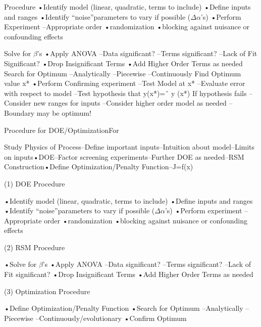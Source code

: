 Procedure
•Identify model (linear, quadratic, terms to include)
•Define inputs and ranges
•Identify “noise”parameters to vary if possible ($\Delta \alpha$’s)
•Perform Experiment
–Appropriate order
•randomization
•blocking against nuisance or confounding effects


Solve for $\beta$’s
•Apply ANOVA
–Data significant?
–Terms significant?
–Lack of Fit Significant?
•Drop Insignificant Terms
•Add Higher Order Terms as needed
Search for Optimum
–Analytically
–Piecewise
–Continuously
Find Optimum value x*
•Perform Confirming experiment
–Test Model at x*
–Evaluate error with respect to model
–Test hypothesis that
y(x*)=ˆ y (x*)
If hypothesis fails
–Consider new ranges for inputs
–Consider higher order model as needed
–Boundary may be optimum!

Procedure for DOE/OptimizationFor

Study Physics of Process–Define important inputs–Intuition about model–Limits on inputs•DOE–Factor screening experiments–Further DOE as needed–RSM Construction•Define Optimization/Penalty Function–J=f(x)


(1) DOE Procedure


•Identify model (linear, quadratic, terms to include)
•Define inputs and ranges
•Identify “noise”parameters to vary if possible ($\Delta \alpha$’s)
•Perform experiment
–Appropriate order
•randomization
•blocking against nuisance or confounding effects

(2) RSM Procedure


•Solve for $\beta$’s
•Apply ANOVA
–Data significant?
–Terms significant?
–Lack of Fit significant?
•Drop Insignificant Terms
•Add Higher Order Terms as needed


(3) Optimization Procedure


•Define Optimization/Penalty Function
•Search for Optimum
–Analytically
–Piecewise
–Continuously/evolutionary
•Confirm Optimum


